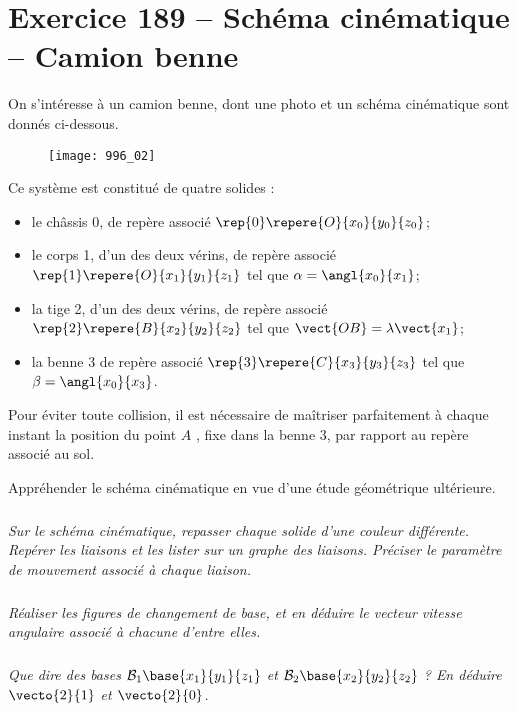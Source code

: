 \section*{Exercice 189 -- Schéma cinématique -- Camion benne}
\setcounter{exo}{0}
On s’intéresse à un camion benne, dont une photo et un schéma cinématique sont donnés ci-dessous.



\begin{figure}[H]
\centering
\texttt{[image: 996\_02]}
\end{figure}

Ce système est constitué de quatre solides :
\begin{itemize}
\item le châssis 0, de repère associé  $\rep{0}\repere{O}{x_0}{y_0}{z_0}$;
\item le corps 1, d'un des deux vérins, de repère associé   $\rep{1}\repere{O}{x_1}{y_1}{z_1}$ tel que $\alpha = \angl{x_0}{x_1}$;
\item la tige 2, d'un des deux vérins, de repère associé   $\rep{2}\repere{B}{x_2}{y_2}{z_2}$ tel que $\vect{OB}=\lambda \vect{x_1}$;
\item la benne 3 de repère associé  $\rep{3}\repere{C}{x_3}{y_3}{z_3}$ tel que $\beta = \angl{x_0}{x_3}$.
\end{itemize}

Pour éviter toute collision, il est nécessaire de maîtriser parfaitement à chaque instant la position du point $A$ , fixe dans la
benne 3, par rapport au repère associé au sol.

 \begin{obj}
Appréhender le schéma cinématique en vue d’une étude géométrique ultérieure.
 \end{obj}



\subparagraph{}
\textit{Sur le schéma cinématique, repasser chaque solide d’une couleur différente. Repérer les liaisons et les lister
sur un graphe des liaisons. Préciser le paramètre de mouvement associé à chaque liaison.}
\ifprof
\begin{corrige}
\end{corrige}
\else
\fi


\subparagraph{}
\textit{Réaliser les figures de changement de base, et en déduire le vecteur vitesse angulaire associé à chacune
d’entre elles.}
\ifprof
\begin{corrige}
\end{corrige}
\else
\fi


\subparagraph{}
\textit{Que dire des bases $\mathcal{B}_1\base{x_1}{y_1}{z_1}$ et  $\mathcal{B}_2\base{x_2}{y_2}{z_2}$ ? En déduire $\vecto{2}{1}$ et $\vecto{2}{0}$.}
\ifprof
\begin{corrige}
\end{corrige}
\else
\fi
